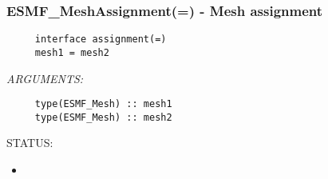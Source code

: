  
\setlength{\oldparskip}{\parskip}
\setlength{\parskip}{1.5ex}
\setlength{\oldparindent}{\parindent}
\setlength{\parindent}{0pt}
\setlength{\oldbaselineskip}{\baselineskip}
\setlength{\baselineskip}{11pt}
 
\def\bv{\begin{verbatim}}
\def\ev{\end{verbatim}}
\def\be{\begin{equation}}
\def\ee{\end{equation}}
\def\bea{\begin{eqnarray}}
\def\eea{\end{eqnarray}}
\def\bi{\begin{itemize}}
\def\ei{\end{itemize}}
\def\bn{\begin{enumerate}}
\def\en{\end{enumerate}}
\def\bd{\begin{description}}
\def\ed{\end{description}}
\def\({\left (}
\def\){\right )}
\def\[{\left [}
\def\]{\right ]}
\def\<{\left  \langle}
\def\>{\right \rangle}
\def\cI{{\cal I}}
\def\diag{\mathop{\rm diag}}
\def\tr{\mathop{\rm tr}}


 
\subsubsection [ESMF\_MeshAssignment(=)] {ESMF\_MeshAssignment(=) - Mesh assignment}


  
\begin{verbatim}     interface assignment(=)
     mesh1 = mesh2\end{verbatim}{\em ARGUMENTS:}
\begin{verbatim}     type(ESMF_Mesh) :: mesh1
     type(ESMF_Mesh) :: mesh2\end{verbatim}
{\sf STATUS:}
   \begin{itemize}
   \item{}
   \end{itemize}
  
